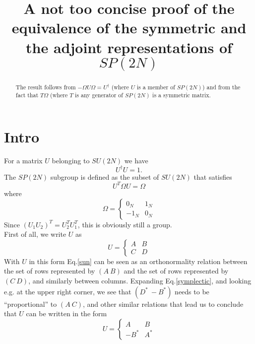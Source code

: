 \documentclass[a4paper,10pt]{article}
\title{A not too concise proof of the
equivalence of the symmetric and the adjoint representations of $SP(2N)$
}
\author{}
\begin{document}
\maketitle

\begin{abstract}
    The result follows from $ - \Omega U \Omega = U^\dagger$ (where $U$ is a
    member of $SP(2N)$) and from the fact that  $ T\Omega $ (where $T$ is any
    generator of $SP(2N)$ is a symmetric matrix.
\end{abstract}

\section{Intro}

For a matrix $U$ belonging to $SU(2N)$ we have 
\begin{equation}
U^\dagger U=1.
\label{sun}
\end{equation}
The $SP(2N)$ subgroup is defined as the subset of $SU(2N)$ that satisfies
\begin{equation}
 U^T \Omega U = \Omega
 \label{symplectic}
\end{equation}
where 
\begin{equation}
 \Omega = \left\{
 \begin{array}{cc}
  0_{N} & 1_{N} \\
  -1_{N} & 0_{N} 
 \end{array}
 \right.
 \label{omega}
\end{equation}
Since $(U_1 U_2)^T = U_2^T U_1^T$, this is obviously still a group. \\
First of all, we write $U$ as 
\begin{equation}
 U = \left\{
 \begin{array}{cc}
  A & B \\
  C & D 
 \end{array}
 \right.
\end{equation}
With $U$ in this form Eq.\ref{sun} can be seen as an orthonormality relation 
between the set of rows represented by $(A\ B)$ and the set of rows represented 
by $(C\ D)$, and similarly between columns. 
Expanding Eq.\ref{symplectic}, and looking e.g. at the upper right 
corner, we see that $(D^\ast\ -B^\ast)$ needs 
to be ``proportional'' to $(A\ C)$, and other similar relations that lead us to
conclude that $U$ can be written in the form
\begin{equation}
 U = \left\{
 \begin{array}{cc}
  A & B \\
  -B^\ast & A^\ast
 \end{array}
 \right.
 \label{usymp}
\end{equation}
\end{document}
